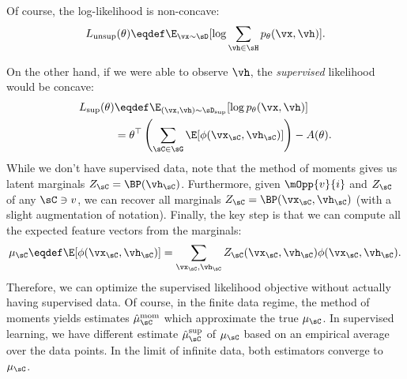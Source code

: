 
Of course, the log-likelihood is non-concave:
\begin{align}
L_\text{unsup}(\theta) \eqdef \E_{\vx \sim \sD}[\log \sum_{\vh \in \sH} p_\theta(\vx,\vh)].
\end{align}

On the other hand, 
if we were able to observe $\vh$, the \emph{supervised} likelihood would be concave:
\begin{align}
\label{eqn:logLinearSupervised}
L_\text{sup}(\theta) &\eqdef \E_{(\vx,\vh) \sim \sD_\text{sup}}[\log p_\theta(\vx,\vh)] \\
                     &= \theta^\top \left(\sum_{\sC \in \sG} \E[\phi(\vx_\sC,\vh_\sC)]\right) - A(\theta).
\end{align}
While we don't have supervised data,
note that the method of moments gives us latent marginals $Z_\sC = \BP(\vh_\sC)$.
Furthermore, given $\mOpp{v}{i}$ and $Z_\sC$ of any $\sC \ni v$, we can recover
all marginals $Z_\sC = \BP(\vx_\sC, \vh_\sC)$ (with a slight augmentation of notation).
Finally, the key step is that we can compute all the expected feature vectors from the marginals:
\begin{align}
\label{eqn:logLinearFeatures}
\mu_\sC \eqdef \E[\phi(\vx_\sC,\vh_\sC)] = \sum_{\vx_\sC,\vh_\sC} Z_\sC(\vx_\sC,\vh_\sC) \phi(\vx_\sC,\vh_\sC).
\end{align}
Therefore, we can optimize the supervised likelihood objective without actually
having supervised data.
Of course, in the finite data regime, the method of moments yields estimates
$\hat \mu^\text{mom}_\sC$ which approximate the true $\mu_\sC$.
In supervised learning, we have different estimate $\hat\mu^\text{sup}_\sC$ of $\mu_\sC$ based on an empirical average
over the data points.
In the limit of infinite data, both estimators converge to $\mu_\sC$.

